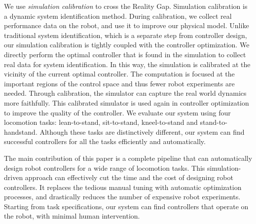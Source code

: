 We use \emph{simulation calibration} to cross the Reality Gap. Simulation calibration is a dynamic system identification method. During calibration, we collect real performance data on the robot, and use it to improve our physical model. Unlike traditional system identification, which is a separate step from controller design, our simulation calibration is tightly coupled with the controller optimization. We directly perform the optimal controller that is found in the simulation to collect real data for system identification. In this way, the simulation is calibrated at the vicinity of the current optimal controller. The computation is focused at the important regions of the control space and thus fewer robot experiments are needed. Through calibration, the simulator can capture the real world dynamics more faithfully. This calibrated simulator is used again in controller optimization to improve the quality of the controller. We evaluate our system using four locomotion tasks: lean-to-stand, sit-to-stand, kneel-to-stand and stand-to-handstand. Although these tasks are distinctively different, our system can find successful controllers for all the tasks efficiently and automatically. 

The main contribution of this paper is a complete pipeline that can automatically design robot controllers for a wide range of locomotion tasks. This simulation-driven approach can effectively cut the time and the cost of designing robot controllers. It replaces the tedious manual tuning with automatic optimization processes, and drastically reduces the number of expensive robot experiments. Starting from task specifications, our system can find controllers that operate on the robot, with minimal human intervention. 
